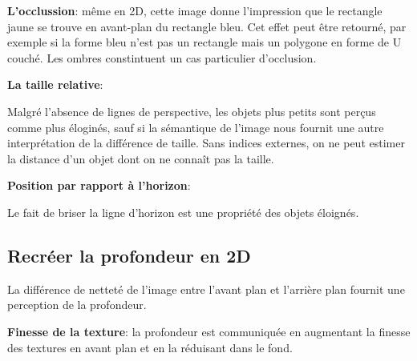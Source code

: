 \textbf{L'occlussion}: m\^eme en 2D, cette image donne l'impression que le rectangle jaune se trouve en avant-plan du rectangle bleu. Cet effet peut \^etre retourn\'e, par exemple si la forme bleu n'est pas un rectangle mais un polygone en forme de U couch\'e. Les ombres constintuent un cas particulier d'occlusion.

\begin{figure}[H]
\centering
{}
\end{figure}

\textbf{La taille relative}:

Malgr\'e l'absence de lignes de perspective, les objets plus petits sont per\c{c}us comme plus \'elogin\'es, sauf si la s\'emantique de l'image nous fournit une autre interpr\'etation de la diff\'erence de taille. Sans indices externes, on ne peut estimer la distance d'un objet dont on ne conna\^it pas la taille. 

\textbf{Position par rapport \`a l'horizon}:

Le fait de briser la ligne d'horizon est une propri\'et\'e des objets \'eloign\'es.

\subsection{Recr\'eer la profondeur en 2D}

La diff\'erence de nettet\'e de l'image entre l'avant plan et l'arri\`ere plan fournit une perception de la profondeur. 

\textbf{Finesse de la texture}: la profondeur est communiqu\'ee en augmentant la finesse des textures en avant plan et en la r\'eduisant dans le fond.

